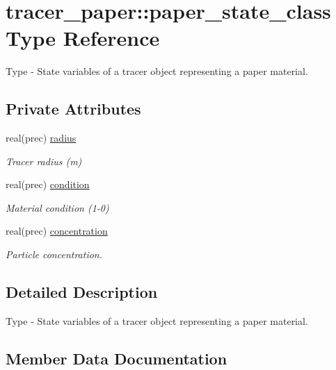 \hypertarget{structtracer__paper_1_1paper__state__class}{}\section{tracer\+\_\+paper\+:\+:paper\+\_\+state\+\_\+class Type Reference}
\label{structtracer__paper_1_1paper__state__class}


Type -\/ State variables of a tracer object representing a paper material.  


\subsection*{Private Attributes}
\begin{DoxyCompactItemize}
\item 
real(prec) \hyperlink{structtracer__paper_1_1paper__state__class_a931d90e457142607c7e1079b99f72298}{radius}
\begin{DoxyCompactList}\small\item\em Tracer radius (m) \end{DoxyCompactList}\item 
real(prec) \hyperlink{structtracer__paper_1_1paper__state__class_a1e2ac1d6419a5ec39dd8529f8cd83112}{condition}
\begin{DoxyCompactList}\small\item\em Material condition (1-\/0) \end{DoxyCompactList}\item 
real(prec) \hyperlink{structtracer__paper_1_1paper__state__class_aa470bc7607345df98b01f08b2450640e}{concentration}
\begin{DoxyCompactList}\small\item\em Particle concentration. \end{DoxyCompactList}\end{DoxyCompactItemize}


\subsection{Detailed Description}
Type -\/ State variables of a tracer object representing a paper material. 

\subsection{Member Data Documentation}
\mbox{\label{structtracer__paper_1_1paper__state__class_aa470bc7607345df98b01f08b2450640e}} 
